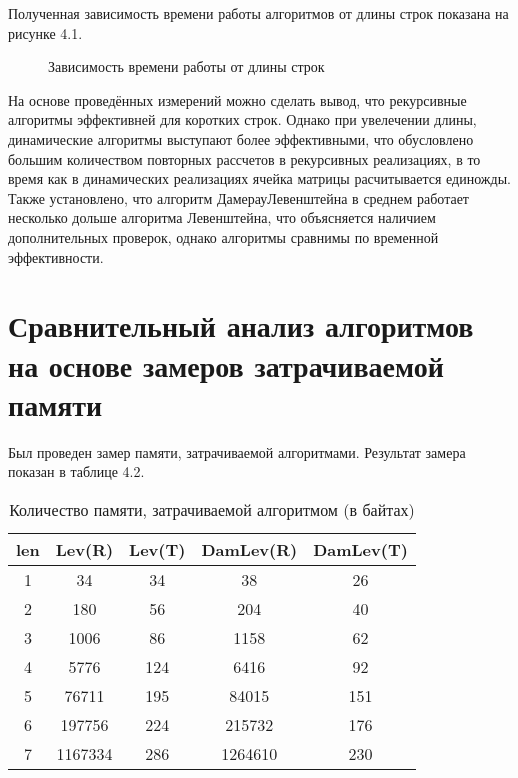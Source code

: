 \documentclass[12pt]{report}
\begin{document}
Полученная зависимость времени работы алгоритмов от длины строк показана на рисунке 4.1.


\begin{figure} [H]
\caption{Зависимость времени работы от длины строк}
\end{figure}


\par
На основе проведённых измерений можно сделать вывод, что рекурсивные алгоритмы эффективней для коротких строк. Однако при увелечении длины, динамические алгоритмы выступают более эффективными, что обусловлено большим количеством повторных рассчетов в рекурсивных реализациях, в то время как в динамических реализациях ячейка матрицы расчитывается единожды. Также установлено, что алгоритм ДамерауЛевенштейна в среднем работает несколько дольше алгоритма Левенштейна, что объясняется наличием дополнительных проверок, однако алгоритмы сравнимы по временной эффективности.



\section{Сравнительный анализ алгоритмов на основе замеров затрачиваемой памяти}
Был проведен замер памяти, затрачиваемой алгоритмами. Результат замера показан в таблице 4.2.


\begin{table} [H]
	\caption{Количество памяти, затрачиваемой алгоритмом (в байтах)}
	\begin{tabular}{|c c c c c|} 
		\hline
		len & Lev(R) & Lev(T) & DamLev(R) & DamLev(T) \\ [0.8ex] 
		\hline\hline
		1 & 34 & 34 & 38 & 26\\
		\hline
		2 & 180 & 56 & 204 & 40\\
		\hline
		3 & 1006 & 86 & 1158 & 62\\
		\hline
		4 & 5776 & 124 & 6416 & 92\\
		\hline
		5 & 76711 & 195 & 84015 & 151\\
		\hline
		6 & 197756 & 224 & 215732 & 176\\
		\hline
		7 & 1167334 & 286 & 1264610 & 230\\
		\hline
	\end{tabular}
	
\end{table}
\end{document}
